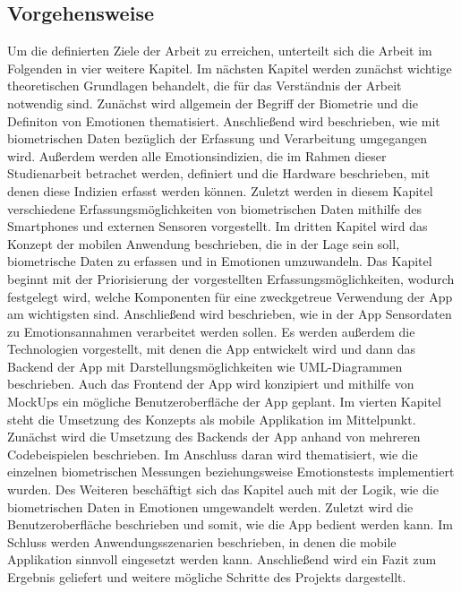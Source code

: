 \subsection{Vorgehensweise}
Um die definierten Ziele der Arbeit zu erreichen, unterteilt sich die Arbeit im Folgenden in vier weitere Kapitel. \newline
Im nächsten Kapitel werden zunächst wichtige theoretischen Grundlagen behandelt, die für das Verständnis der Arbeit notwendig sind. Zunächst wird allgemein der Begriff der Biometrie und die Definiton von Emotionen thematisiert. Anschließend wird beschrieben, wie mit biometrischen Daten bezüglich der Erfassung und Verarbeitung umgegangen wird. Außerdem werden alle Emotionsindizien, die im Rahmen dieser Studienarbeit betrachet werden, definiert und die Hardware beschrieben, mit denen diese Indizien erfasst werden können. Zuletzt werden in diesem Kapitel verschiedene Erfassungsmöglichkeiten von biometrischen Daten mithilfe des Smartphones und externen Sensoren vorgestellt. \newline
Im dritten Kapitel wird das Konzept der mobilen Anwendung beschrieben, die in der Lage sein soll, biometrische Daten zu erfassen und in Emotionen umzuwandeln. Das Kapitel beginnt mit der Priorisierung der vorgestellten Erfassungsmöglichkeiten, wodurch festgelegt wird, welche Komponenten für eine zweckgetreue Verwendung der App am wichtigsten sind. Anschließend wird beschrieben, wie in der App Sensordaten zu Emotionsannahmen verarbeitet werden sollen. Es werden außerdem die Technologien vorgestellt, mit denen die App entwickelt wird und dann das Backend der App mit Darstellungsmöglichkeiten wie UML-Diagrammen beschrieben. Auch das Frontend der App wird konzipiert und mithilfe von MockUps ein mögliche Benutzeroberfläche der App geplant. \newline
Im vierten Kapitel steht die Umsetzung des Konzepts als mobile Applikation im Mittelpunkt. Zunächst wird die Umsetzung des Backends der App anhand von mehreren Codebeispielen beschrieben. Im Anschluss daran wird thematisiert, wie die einzelnen biometrischen Messungen beziehungsweise Emotionstests implementiert wurden. Des Weiteren beschäftigt sich das Kapitel auch mit der Logik, wie die biometrischen Daten in Emotionen umgewandelt werden. Zuletzt wird die Benutzeroberfläche beschrieben und somit, wie die App bedient werden kann. \newline
Im Schluss werden Anwendungsszenarien beschrieben, in denen die mobile Applikation sinnvoll eingesetzt werden kann. Anschließend wird ein Fazit zum Ergebnis geliefert und weitere mögliche Schritte des Projekts dargestellt.